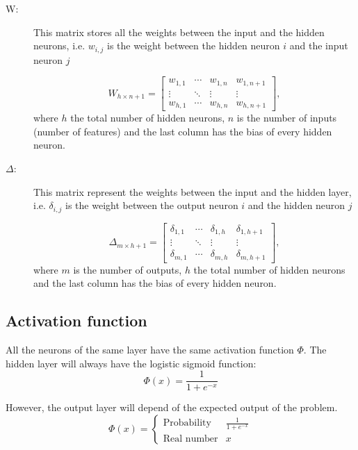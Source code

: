 \begin{description}
 \item[W:]
   This matrix stores all the weights between the input and the hidden neurons, i.e.
   $w_{i,j}$ is the weight between the hidden neuron $i$ and the input neuron $j$

  \[
    W_{h \times {n+1}} =
    \left[
      \begin{array}{ccc|c}
        w_{1, 1} & \cdots & w_{1, n} & w_{1, n+1} \\
        \vdots   & \ddots & \vdots   & \vdots     \\
        w_{h, 1} & \cdots & w_{h, n} & w_{h, n+1}
      \end{array}
    \right],
  \]
  where $h$ the total number of hidden neurons,
  $n$ is the number of inputs (number of features)
  and the last column has the bias of every hidden neuron.

 \item[$\Delta$:] This matrix represent the weights between the input and the hidden layer, i.e.
  $\delta_{i,j}$ is the weight between the output neuron $i$ and the hidden neuron $j$

  \[
    \Delta_{m \times h+1} =
    \left[
      \begin{array}{ccc|c}
        \delta_{1,1} & \cdots & \delta_{1,h} & \delta_{1,h+1}\\
        \vdots & \ddots &  \vdots & \vdots\\
        \delta_{m,1} & \cdots & \delta_{m,h} &\delta_{m,h+1}
      \end{array}
    \right],
  \]
  where $m$ is the number of outputs,
  $h$ the total number of hidden neurons
  and the last column has the bias of every hidden neuron.

\end{description}


\subsection*{Activation function}

All the neurons of the same layer have the same activation function $\Phi$.
The hidden layer will always have the logistic sigmoid function:
\[
  \Phi(x) = \frac{1}{1 + e^{-x}}
\]

However, the output layer will depend of the expected output of the problem.
\[
  \Phi(x) =
  \begin{cases}
     \text{Probability} & \frac{1}{1 + e^{-x}} \\
     \text{Real number} & x
  \end{cases}
\]


